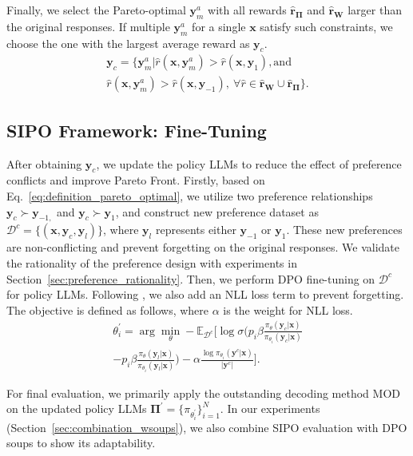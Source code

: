 Finally, we select the Pareto-optimal $\textbf{y}^a_m$ with all rewards $\hat{\textbf{r}}_{ \boldsymbol \Pi}$ and $\hat{\textbf{r}}_{\textbf{W}}$ larger than the original responses. If multiple $\textbf{y}_m^a$ for a single $\textbf{x}$ satisfy such constraints, we choose the one with the largest average reward as $\textbf{y}_c$. 
\begin{multline}
    \textbf{y}_c = \{\textbf{y}_m^a| \hat{r}(\textbf{x}, \textbf{y}^a_m) > \hat{r} (\textbf{x}, \textbf{y}_1) , \text{and}  \\
    \hat{r} (\textbf{x}, \textbf{y}^a_m) > \hat{r}(\textbf{x}, \textbf{y}_{-1}), 
    \ \forall \hat{r} \in \hat{\textbf{r}}_{\textbf{W}} \cup \hat{\textbf{r}}_{ \boldsymbol\Pi} 
    \}.
\end{multline}

\subsection{SIPO Framework: Fine-Tuning}
\label{subsection:pair_construction}
After obtaining $\textbf{y}_c$, we update the policy LLMs to reduce the effect of preference conflicts and improve Pareto Front. 
Firstly, based on Eq.~\eqref{eq:definition_pareto_optimal}, we utilize two preference relationships
$\textbf{y}_c \succ \textbf{y}_{-1, }$ and $\textbf{y}_c \succ \textbf{y}_1$, and construct new preference dataset as $\mathcal{D}^c = \{(\textbf{x}, \textbf{y}_c, \textbf{y}_l)\}$, where $\textbf{y}_l$ represents either $\textbf{y}_{-1}$ or $\textbf{y}_1$. 
These new preferences are non-conflicting and prevent forgetting on the original responses. We validate the rationality of the preference design with experiments in Section~\ref{sec:preference_rationality}. 
Then, we perform DPO fine-tuning on $\mathcal{D}^c$ for policy LLMs. Following \citet{DBLP:journals/corr/abs-2404-19733}, we also add an NLL loss term to prevent forgetting. 
The objective is defined as follows, where $\alpha$ is the weight for NLL loss.
\begin{multline}
    \theta_i^{'} = \arg \min_{\theta} -\mathbb{E}_{\mathcal{D}^c}
    \Bigg[ 
    \log \sigma \Bigg(p_i\beta \frac{\pi_\theta(\textbf{y}_c|\textbf{x})}{\pi_{\theta_i}(\textbf{y}_c|\textbf{x})} \\
    - p_i\beta \frac{\pi_\theta(\textbf{y}_{l}|\textbf{x})}{\pi_{\theta_i}(\textbf{y}_{l}|\textbf{x})} \Bigg) - \alpha \frac{\log \pi_{\theta_i}(\textbf{y}^c | \textbf{x})}{|\textbf{y}^c|}
    \Bigg].
\label{eq:theta_i_prime}
\end{multline}

For final evaluation, we primarily apply the outstanding decoding method MOD on the updated policy LLMs $\boldsymbol \Pi^{\prime} = \{\pi_{\theta_i^{\prime}}\}_{i=1}^N$. 
In our experiments (\cf Section~\ref{sec:combination_wsoups}), we also combine SIPO evaluation with DPO soups to show its adaptability. 
